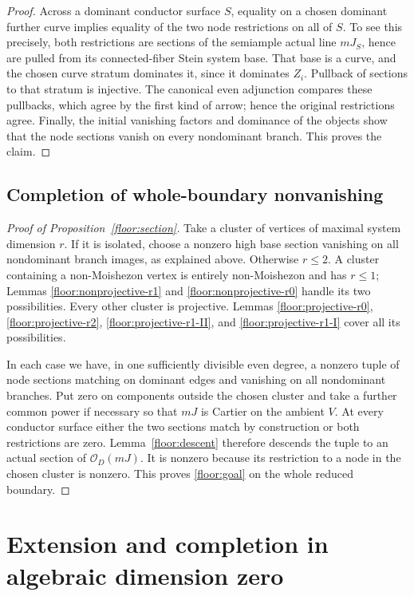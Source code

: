 \documentclass[11pt,letterpaper]{article}
\theoremstyle{definition}
\theoremstyle{remark}
\begin{document}
\begin{proof}
Across a dominant conductor surface
$S$, equality on a chosen dominant
further curve implies equality of the
two node restrictions on all of $S$.
To see this precisely, both restrictions
are sections of the semiample actual
line $mJ_S$, hence are pulled from its
connected-fiber Stein system base.
That base is a curve, and the chosen
curve stratum dominates it, since it
dominates $Z_i$.  Pullback of sections
to that stratum is injective.  The
canonical even adjunction compares
these pullbacks, which agree by the
first kind of arrow; hence the original
restrictions agree.  Finally, the
initial vanishing factors and dominance
of the objects show that the node
sections vanish on every nondominant
branch.  This proves the claim.
\end{proof}

\subsection{Completion of whole-boundary nonvanishing}

\begin{proof}[Proof of Proposition~\ref{floor:section}]
Take a cluster of vertices of maximal system
dimension $r$.  If it is isolated, choose a
nonzero high base section vanishing on all
nondominant branch images, as explained
above.  Otherwise $r\le2$.  A cluster
containing a non-Moishezon vertex is entirely
non-Moishezon and has $r\le1$; Lemmas
\ref{floor:nonprojective-r1} and
\ref{floor:nonprojective-r0} handle its two
possibilities.  Every other cluster is
projective.  Lemmas
\ref{floor:projective-r0},
\ref{floor:projective-r2},
\ref{floor:projective-r1-II}, and
\ref{floor:projective-r1-I} cover all its
possibilities.

In each case we have, in one sufficiently
divisible even degree, a nonzero tuple of
node sections matching on dominant edges
and vanishing on all nondominant branches.
Put zero on components outside the chosen
cluster and take a further common power
if necessary so that $mJ$ is Cartier on
the ambient $V$.  At every conductor
surface either the two sections match
by construction or both restrictions
are zero.  Lemma~\ref{floor:descent}
therefore descends the tuple to an
actual section of $\mathcal{O}_D(mJ)$.  It is
nonzero because its restriction to a
node in the chosen cluster is nonzero.
This proves \eqref{floor:goal} on the
whole reduced boundary.
\end{proof}

\section{Extension and completion in algebraic dimension zero}
\label{sec:completion}
\end{document}
